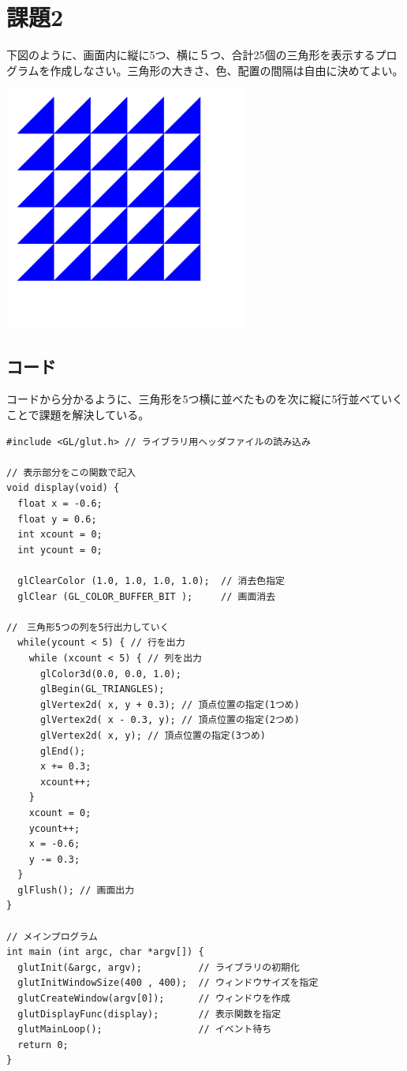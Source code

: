 \documentclass{scrartcl}
\begin{document}
\newpage

\section{課題2}
\label{sec:org3c8a7d3}
下図のように、画面内に縦に5つ、横に５つ、合計25個の三角形を表示するプログラムを作成しなさい。三角形の大きさ、色、配置の間隔は自由に決めてよい。\\


\begin{center}
\includegraphics[width=8cm]{./2017-10-04.png}
\end{center}

\subsection{コード}
\label{sec:orgb8b8e7d}
コードから分かるように、三角形を5つ横に並べたものを次に縦に5行並べていくことで課題を解決している。\\


\begin{verbatim}
#include <GL/glut.h> // ライブラリ用ヘッダファイルの読み込み

// 表示部分をこの関数で記入
void display(void) {        
  float x = -0.6;
  float y = 0.6;
  int xcount = 0;
  int ycount = 0;

  glClearColor (1.0, 1.0, 1.0, 1.0);  // 消去色指定
  glClear (GL_COLOR_BUFFER_BIT );     // 画面消去

//　三角形5つの列を5行出力していく
  while(ycount < 5) { // 行を出力
    while (xcount < 5) { // 列を出力
      glColor3d(0.0, 0.0, 1.0);
      glBegin(GL_TRIANGLES);
      glVertex2d( x, y + 0.3); // 頂点位置の指定(1つめ)
      glVertex2d( x - 0.3, y); // 頂点位置の指定(2つめ)
      glVertex2d( x, y); // 頂点位置の指定(3つめ)
      glEnd();
      x += 0.3;
      xcount++;
    }
    xcount = 0;
    ycount++;
    x = -0.6;
    y -= 0.3;
  }
  glFlush(); // 画面出力
}

// メインプログラム
int main (int argc, char *argv[]) { 
  glutInit(&argc, argv);          // ライブラリの初期化
  glutInitWindowSize(400 , 400);  // ウィンドウサイズを指定
  glutCreateWindow(argv[0]);      // ウィンドウを作成
  glutDisplayFunc(display);       // 表示関数を指定
  glutMainLoop();                 // イベント待ち
  return 0;
}
\end{verbatim}
\end{document}
